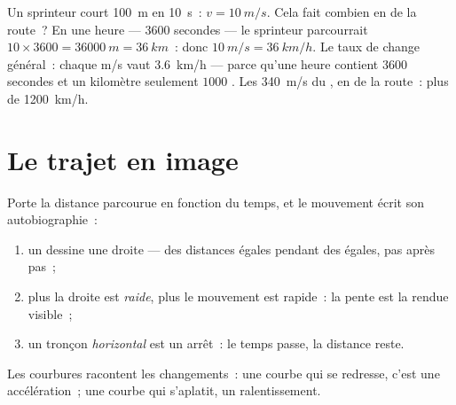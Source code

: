 \begin{example}\label{ex:g7:motion-average-speed:units}
Un sprinteur court \qty{100}{m} en \qty{10}{s}~:
$v = \qty{10}{m/s}$. Cela fait combien en  de la route~? En une
heure --- $3600$ secondes --- le sprinteur parcourrait
$10 \times 3600 = \qty{36000}{m} = \qty{36}{km}$~: donc
$\qty{10}{m/s} = \qty{36}{km/h}$. Le taux de change général~: chaque
\unit{m/s} vaut \qty{3.6}{km/h} --- parce qu'une heure contient
$3600$ secondes et un kilomètre seulement $1000$ . Les
\qty{340}{m/s} du , en  de la route~: plus de
\qty{1200}{km/h}.
\end{example}

\section{Le trajet en image}

\begin{proposition}\label{prop:g7:motion-average-speed:graphs}
Porte la distance parcourue en fonction du temps, et le mouvement
écrit son autobiographie~:
\begin{enumerate}
  \item un  dessine une droite --- des distances
        égales pendant des  égales, pas après pas~;
  \item plus la droite est \emph{raide}, plus le mouvement est
        rapide~: la pente est la  rendue visible~;
  \item un tronçon \emph{horizontal} est un arrêt~: le temps passe,
        la distance reste.
\end{enumerate}
Les courbures racontent les changements~: une courbe qui se redresse,
c'est une accélération~; une courbe qui s'aplatit, un ralentissement.
\end{proposition}

